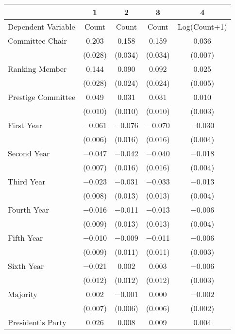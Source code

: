 \begin{table}
\centering
\begin{tabular}[t]{lcccc}
\toprule
  & 1 & 2 & 3 & 4\\
\midrule
Dependent Variable & Count & Count & Count & Log(Count+1)\\
Committee Chair & \num{0.203} & \num{0.158} & \num{0.159} & \num{0.036}\\
 & (\num{0.028}) & (\num{0.034}) & (\num{0.034}) & (\num{0.007})\\
Ranking Member & \num{0.144} & \num{0.090} & \num{0.092} & \num{0.025}\\
 & (\num{0.028}) & (\num{0.024}) & (\num{0.024}) & (\num{0.005})\\
Prestige Committee & \num{0.049} & \num{0.031} & \num{0.031} & \num{0.010}\\
 & (\num{0.010}) & (\num{0.010}) & (\num{0.010}) & (\num{0.003})\\
First Year & \num{-0.061} & \num{-0.076} & \num{-0.070} & \num{-0.030}\\
 & (\num{0.006}) & (\num{0.016}) & (\num{0.016}) & (\num{0.004})\\
Second Year & \num{-0.047} & \num{-0.042} & \num{-0.040} & \num{-0.018}\\
 & (\num{0.007}) & (\num{0.016}) & (\num{0.016}) & (\num{0.004})\\
Third Year & \num{-0.023} & \num{-0.031} & \num{-0.033} & \num{-0.013}\\
 & (\num{0.008}) & (\num{0.013}) & (\num{0.013}) & (\num{0.004})\\
Fourth Year & \num{-0.016} & \num{-0.011} & \num{-0.013} & \num{-0.006}\\
 & (\num{0.009}) & (\num{0.013}) & (\num{0.013}) & (\num{0.004})\\
Fifth Year & \num{-0.010} & \num{-0.009} & \num{-0.011} & \num{-0.006}\\
 & (\num{0.009}) & (\num{0.011}) & (\num{0.011}) & (\num{0.003})\\
Sixth Year & \num{-0.021} & \num{0.002} & \num{0.003} & \num{-0.006}\\
 & (\num{0.012}) & (\num{0.012}) & (\num{0.012}) & (\num{0.003})\\
Majority & \num{0.002} & \num{-0.001} & \num{0.000} & \num{-0.002}\\
 & (\num{0.007}) & (\num{0.006}) & (\num{0.006}) & (\num{0.002})\\
President's Party & \num{0.026} & \num{0.008} & \num{0.009} & \num{0.004}\\

\end{tabular}
\end{table}
